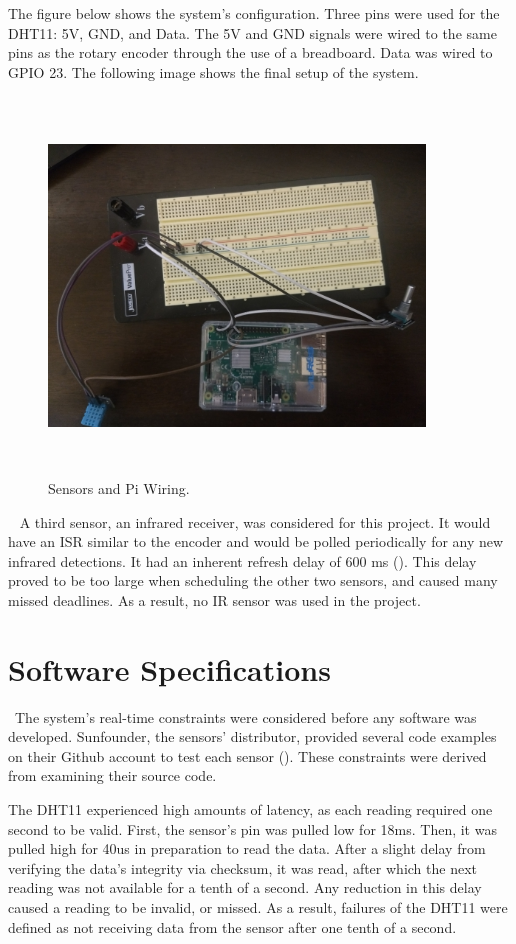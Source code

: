 \documentclass[letterpaper, 12pt]{article}
\begin{document}
The figure below shows the system's configuration.
Three pins were used for the DHT11: 5V, GND, and Data.  The 5V and GND signals were wired to the same pins as the rotary encoder through the use of a breadboard.  Data was wired to GPIO 23.  The following image shows the final setup of the system.
~\newline
\begin{figure}[H]
	\centering
	\includegraphics[width=10cm,height=10cm,keepaspectratio]{circuit.jpg}
	\caption[Ciruit]{Sensors and Pi Wiring.}
	\label{fig:Circuit}
\end{figure}

~\newline
A third sensor, an infrared receiver, was considered for this project. It would have an ISR similar to the encoder and would be polled periodically for any new infrared detections. It had an inherent refresh delay of 600 ms (\cite{sunfounder2018}).  This delay proved to be too large when scheduling the other two sensors, and caused many missed deadlines.  As a result, no IR sensor was used in the project.
~\newpage
\section{Software Specifications}
~\indent The system's real-time constraints were considered before any software was developed.  Sunfounder, the sensors' distributor, provided several code examples on their Github account to test each sensor (\cite{sunfounder2018}).  These constraints were derived from examining their source code.
  
\indent The DHT11 experienced high amounts of latency, as each reading required one second to be valid.  First, the sensor's pin was pulled low for 18ms. Then, it was pulled high for 40us in preparation to read the data.  After a slight delay from verifying the data's integrity via checksum, it was read, after which the next reading was not available for a tenth of a second.  Any reduction in this delay caused a reading to be invalid, or missed.  As a result, failures of the DHT11 were defined as not receiving data from the sensor after one tenth of a second.
\end{document}
